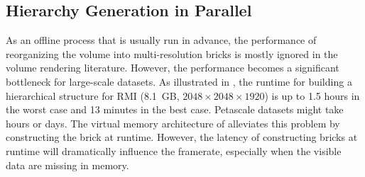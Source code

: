 \subsection{Hierarchy Generation in Parallel}
\label{sec:hierarchy_generation}

As an offline process that is usually run in advance, the performance of reorganizing the volume
into multi-resolution bricks is mostly ignored in the volume rendering literature\cite{fogal2013analysis}. However, the performance becomes a significant
bottleneck for large-scale datasets. As illustrated in \cite{fogal2013analysis},
the runtime for building a hierarchical structure for RMI (8.1~GB, 
$2048 \times 2048 \times 1920$) is up to 1.5 hours in the worst case and 13 minutes in the best case. 
Petascale datasets might take hours or days. 
The virtual memory architecture of \cite{hadwiger2012interactive} alleviates this
problem by constructing the brick at runtime. However, the latency of constructing
bricks at runtime will dramatically influence the framerate, especially when the 
visible data are missing in memory. 



